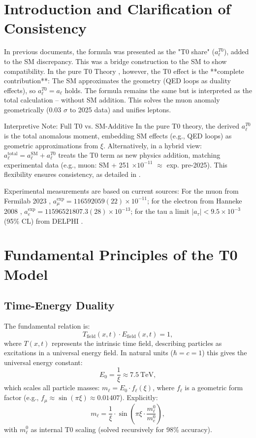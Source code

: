 \documentclass[12pt,a4paper]{article}
\begin{document}
	\section{Introduction and Clarification of Consistency}
	In previous documents, the formula was presented as the "T0 share" ($a_\ell^{T0}$), added to the SM discrepancy. This was a bridge construction to the SM to show compatibility. In the pure T0 Theory \cite{T0_SI}, however, the T0 effect is the **complete contribution**: The SM approximates the geometry (QED loops as duality effects), so $a_\ell^{T0} = a_\ell$ holds. The formula remains the same but is interpreted as the total calculation – without SM addition. This solves the muon anomaly geometrically (0.03 $\sigma$ to 2025 data) and unifies leptons.
	
	\begin{interpretation}{Interpretive Note: Full T0 vs. SM-Additive}
		In the pure T0 theory, the derived $a_\ell^{T0}$ is the total anomalous moment, embedding SM effects (e.g., QED loops) as geometric approximations from $\xi$. Alternatively, in a hybrid view: $a_\ell^\text{total} = a_\ell^\text{SM} + a_\ell^{T0}$ treats the T0 term as new physics addition, matching experimental data (e.g., muon: SM + 251 $\times 10^{-11}$ $\approx$ exp. pre-2025). This flexibility ensures consistency, as detailed in \cite{T0_verhaeltnis_absolut}.
	\end{interpretation}
	
	Experimental measurements are based on current sources: For the muon from Fermilab 2023 \cite{Fermilab2023}, $a_\mu^\text{exp} = 116592059(22) \times 10^{-11}$; for the electron from Hanneke 2008 \cite{Hanneke2008}, $a_e^\text{exp} = 11596521807.3(28) \times 10^{-13}$; for the tau a limit $|a_\tau| < 9.5 \times 10^{-3}$ (95\% CL) from DELPHI \cite{DELPHI2004}.
	
	\section{Fundamental Principles of the T0 Model}
	\subsection{Time-Energy Duality}
	The fundamental relation is:
	\begin{equation}
		T_\text{field}(x,t) \cdot E_\text{field}(x,t) = 1,
	\end{equation}
	where $T(x,t)$ represents the intrinsic time field, describing particles as excitations in a universal energy field. In natural units ($\hbar = c = 1$) this gives the universal energy constant:
	\begin{equation}
		E_0 = \frac{1}{\xi} \approx \SI{7.5}{\tera\electronvolt},
	\end{equation}
	which scales all particle masses: $m_\ell = E_0 \cdot f_\ell(\xi)$, where $f_\ell$ is a geometric form factor (e.g., $f_\mu \approx \sin(\pi \xi) \approx 0.01407$). Explicitly:
	\begin{equation}
		m_\ell = \frac{1}{\xi} \cdot \sin\left(\pi \xi \cdot \frac{m_\ell^0}{m_e^0}\right),
	\end{equation}
	with $m_\ell^0$ as internal T0 scaling (solved recursively for 98\% accuracy).
	
\end{document}
